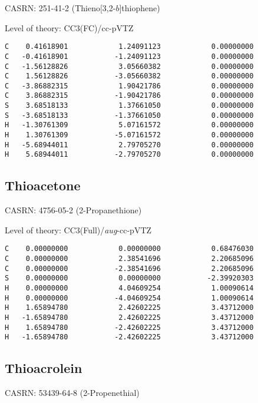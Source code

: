 \documentclass[journal=jctcce,manuscript=article,layout=traditional]{achemso}
\newcommand{\TZ}{cc-pVTZ}
\newcommand{\AVTZ}{\emph{aug}-cc-pVTZ}
\begin{document}
CASRN: 251-41-2 (Thieno[3,2-$b$]thiophene)

\begin{singlespace}
\noindent Level of theory: CC3(FC)/{\TZ}
\begin{verbatim}
C    0.41618901            1.24091123            0.00000000
C   -0.41618901           -1.24091123            0.00000000
C   -1.56128826            3.05660382            0.00000000
C    1.56128826           -3.05660382            0.00000000
C   -3.86882315            1.90421786            0.00000000
C    3.86882315           -1.90421786            0.00000000
S    3.68518133            1.37661050            0.00000000
S   -3.68518133           -1.37661050            0.00000000
H   -1.30761309            5.07161572            0.00000000
H    1.30761309           -5.07161572            0.00000000
H   -5.68944011            2.79705270            0.00000000
H    5.68944011           -2.79705270            0.00000000
\end{verbatim}
\end{singlespace}

\subsection{Thioacetone}

CASRN: 4756-05-2 (2-Propanethione)

\begin{singlespace}
\noindent Level of theory: CC3(Full)/{\AVTZ}
\begin{verbatim}
C    0.00000000            0.00000000            0.68476030
C    0.00000000            2.38541696            2.20685096
C    0.00000000           -2.38541696            2.20685096
S    0.00000000            0.00000000           -2.39920303
H    0.00000000            4.04609254            1.00090614
H    0.00000000           -4.04609254            1.00090614
H    1.65894780            2.42602225            3.43712000
H   -1.65894780            2.42602225            3.43712000
H    1.65894780           -2.42602225            3.43712000
H   -1.65894780           -2.42602225            3.43712000
\end{verbatim}
\end{singlespace}

\subsection{Thioacrolein}

CASRN: 53439-64-8 (2-Propenethial)
\end{document}
